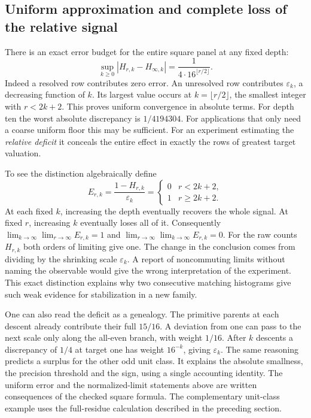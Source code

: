 \documentclass[12pt,letterpaper]{article}
\begin{document}
\subsection{Uniform approximation and complete loss of the relative signal}
There is an exact error budget for the entire square panel at any fixed depth:
\[
     \sup_{k\ge0}|H_{r,k}-H_{\infty,k}|
           =\frac{1}{4\cdot16^{\lfloor r/2\rfloor}} .
\]
Indeed a resolved row contributes zero error. An unresolved row contributes $\varepsilon_k$, a decreasing function of $k$. Its largest value occurs at $k=\lfloor r/2\rfloor$, the smallest integer with $r<2k+2$. This proves uniform convergence in absolute terms. For depth ten the worst absolute discrepancy is $1/4194304$. For applications that only need a coarse uniform floor this may be sufficient. For an experiment estimating the \emph{relative deficit} it conceals the entire effect in exactly the rows of greatest target valuation.

To see the distinction algebraically define
\[
 E_{r,k}=\frac{1-H_{r,k}}{\varepsilon_k}
         =\begin{cases}0&r<2k+2,\\1&r\ge2k+2.\end{cases}
\]
At each fixed $k$, increasing the depth eventually recovers the whole signal. At fixed $r$, increasing $k$ eventually loses all of it. Consequently $\lim_{k\to\infty}\lim_{r\to\infty}E_{r,k}=1$ and $\lim_{r\to\infty}\lim_{k\to\infty}E_{r,k}=0$. For the raw counts $H_{r,k}$ both orders of limiting give one. The change in the conclusion comes from dividing by the shrinking scale $\varepsilon_k$. A report of noncommuting limits without naming the observable would give the wrong interpretation of the experiment. This exact distinction explains why two consecutive matching histograms give such weak evidence for stabilization in a new family.

One can also read the deficit as a genealogy. The primitive parents at each descent already contribute their full $15/16$. A deviation from one can pass to the next scale only along the all-even branch, with weight $1/16$. After $k$ descents a discrepancy of $1/4$ at target one has weight $16^{-k}$, giving $\varepsilon_k$. The same reasoning predicts a surplus for the other odd unit class. It explains the absolute smallness, the precision threshold and the sign, using a single accounting identity. The uniform error and the normalized-limit statements above are written consequences of the checked square formula. The complementary unit-class example uses the full-residue calculation described in the preceding section.
\end{document}
